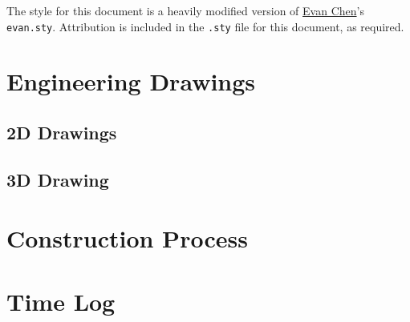 \documentclass{scrartcl}
\begin{document}
\maketitle
\begin{foreword}
    The style for this document is a heavily modified version of \href{https://github.com/vEnhance}{Evan Chen}'s \texttt{evan.sty}. Attribution is included in the \texttt{.sty} file for this document, as required. 
\end{foreword}
\tableofcontents

\newpage

\section{Engineering Drawings}
\subsection{2D Drawings}

\subsection{3D Drawing}

\section{Construction Process}

\section{Time Log}
\end{document}
